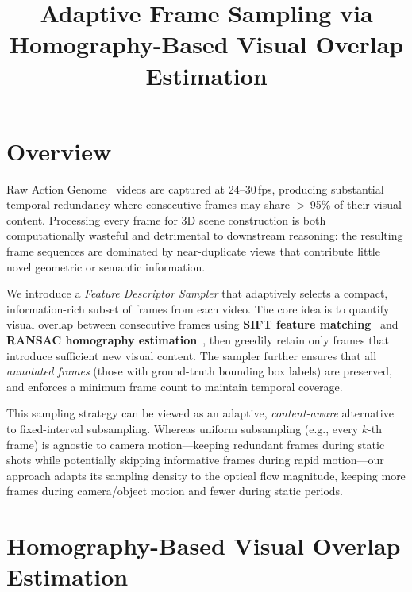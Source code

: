\documentclass[runningheads]{llncs}
\begin{document}
\title{Adaptive Frame Sampling via Homography-Based Visual Overlap Estimation}

\maketitle


\section{Overview}
\label{sec:fd_overview}

Raw Action Genome~\cite{ji2020action} videos are captured at 24--30\,fps, producing substantial temporal redundancy where consecutive frames may share $>$\,95\% of their visual content.  Processing every frame for 3D scene construction is both computationally wasteful and detrimental to downstream reasoning: the resulting frame sequences are dominated by near-duplicate views that contribute little novel geometric or semantic information.

We introduce a \emph{Feature Descriptor Sampler} that adaptively selects a compact, information-rich subset of frames from each video.  The core idea is to quantify visual overlap between consecutive frames using \textbf{SIFT feature matching}~\cite{lowe2004distinctive} and \textbf{RANSAC homography estimation}~\cite{fischler1981random}, then greedily retain only frames that introduce sufficient new visual content.  The sampler further ensures that all \emph{annotated frames} (those with ground-truth bounding box labels) are preserved, and enforces a minimum frame count to maintain temporal coverage.

This sampling strategy can be viewed as an adaptive, \emph{content-aware} alternative to fixed-interval subsampling.  Whereas uniform subsampling (e.g., every $k$-th frame) is agnostic to camera motion---keeping redundant frames during static shots while potentially skipping informative frames during rapid motion---our approach adapts its sampling density to the optical flow magnitude, keeping more frames during camera/object motion and fewer during static periods.


\section{Homography-Based Visual Overlap Estimation}
\label{sec:homography_overlap}
\end{document}
